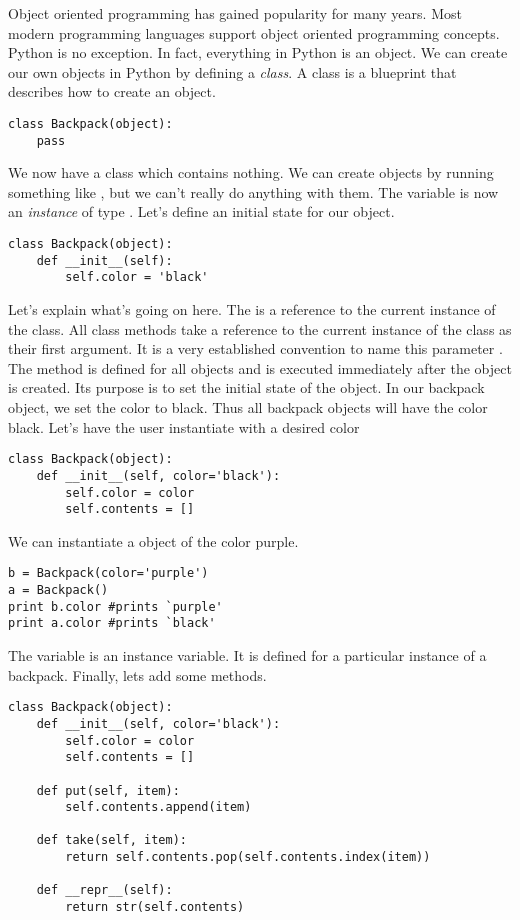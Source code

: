 Object oriented programming has gained popularity for many years.
Most modern programming languages support object oriented programming concepts.
Python is no exception.
In fact, everything in Python is an object.
We can create our own objects in Python by defining a \emph{class}.
A class is a blueprint that describes how to create an object.
\begin{lstlisting}
class Backpack(object):
    pass
\end{lstlisting}
We now have a class  which contains nothing.
We can create  objects by running something like , but we can't really do anything with them.
The variable  is now an \emph{instance} of type .
Let's define an initial state for our object.
\begin{lstlisting}
class Backpack(object):
    def __init__(self):
        self.color = 'black'
\end{lstlisting}
Let's explain what's going on here.
The  is a reference to the current instance of the class.
All class methods take a reference to the current instance of the class as their first argument.
It is a very established convention to name this parameter .
The  method is defined for all objects and is executed immediately after the object is created.
Its purpose is to set the initial state of the object.
In our backpack object, we set the color to black.
Thus all backpack objects will have the color black.
Let's have the user instantiate with a desired color
\begin{lstlisting}
class Backpack(object):
    def __init__(self, color='black'):
        self.color = color
        self.contents = []
\end{lstlisting}
We can instantiate a  object of the color purple.
\begin{lstlisting}
b = Backpack(color='purple')
a = Backpack()
print b.color #prints `purple'
print a.color #prints `black'
\end{lstlisting}
The variable  is an instance variable.
It is defined for a particular instance of a backpack.
Finally, lets add some methods.
\begin{lstlisting}
class Backpack(object):
    def __init__(self, color='black'):
        self.color = color
        self.contents = []
        
    def put(self, item):
        self.contents.append(item)
        
    def take(self, item):
        return self.contents.pop(self.contents.index(item))
        
    def __repr__(self):
        return str(self.contents)
\end{lstlisting}
